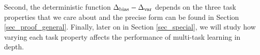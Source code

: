Second, the deterministic function $\Delta_{\text{bias}} - \Delta_{\text{var}}$ depends on the three task properties that we care about and the precise form can be found in Section \ref{sec_proof_general}.
Finally, later on in Section \ref{sec_special}, we will study how varying each task property affects the performance of multi-task learning in depth.

%
%
%



